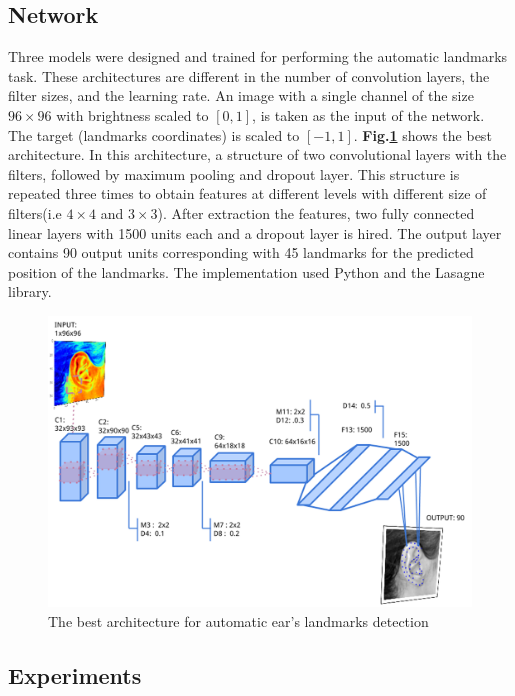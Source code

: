 \subsection{Network}
Three models were designed and trained for performing the automatic landmarks task. These architectures are different in the number of convolution layers, the filter sizes, and the learning rate. An image with a single channel of the size  $96 \times 96$ with brightness scaled to $[0,1]$, is taken as the input of the network. The target (landmarks coordinates) is scaled to $[-1,1]$. \textbf{Fig.\ref{1Econv}} shows the best architecture. In this architecture, a structure of two convolutional layers with the filters, followed by maximum pooling and dropout layer. This structure is repeated three times to obtain features at different levels with different size of filters(i.e $4 \times 4$ and $3 \times 3$). After extraction the features, two fully connected linear layers with 1500 units each and a dropout layer is hired. The output layer contains 90 output units corresponding with 45 landmarks for the predicted position of the landmarks. The implementation used Python and the Lasagne library\cite{lasagne}.
\begin{figure}[h!]
	\centering
	\includegraphics[scale=0.4]{images/ear_cnn}
	\caption{The best architecture for automatic ear's landmarks detection}
	\label{1Econv}
\end{figure}
\subsection{Experiments}

